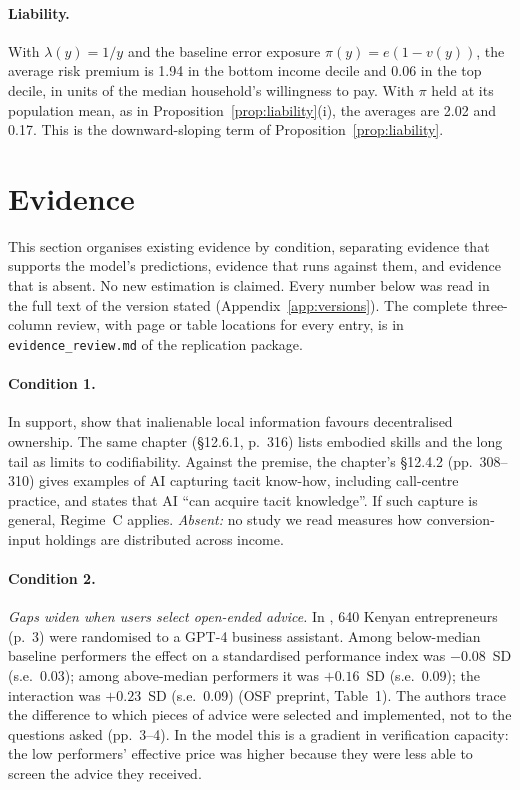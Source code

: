 \documentclass[12pt]{article}
\theoremstyle{remark}
\begin{document}
\paragraph{Liability.} With $\lambda(y)=1/y$ and the baseline error exposure $\pi(y)=e(1-v(y))$, the average risk premium is 1.94 in the bottom income decile and 0.06 in the top decile, in units of the median household's willingness to pay. With $\pi$ held at its population mean, as in Proposition~\ref{prop:liability}(i), the averages are 2.02 and 0.17. This is the downward-sloping term of Proposition~\ref{prop:liability}.

\section{Evidence}\label{sec:evidence}

This section organises existing evidence by condition, separating evidence that supports the model's predictions, evidence that runs against them, and evidence that is absent. No new estimation is claimed. Every number below was read in the full text of the version stated (Appendix~\ref{app:versions}). The complete three-column review, with page or table locations for every entry, is in \texttt{evidence\_review.md} of the replication package.

\paragraph{Condition 1.} In support, \citet[Proposition~2, p.~308]{brynjolfsson2026hayek} show that inalienable local information favours decentralised ownership. The same chapter (\S12.6.1, p.~316) lists embodied skills and the long tail as limits to codifiability. Against the premise, the chapter's \S12.4.2 (pp.~308--310) gives examples of AI capturing tacit know-how, including call-centre practice, and \citet[p.~33]{garicano2026comment} states that AI ``can acquire tacit knowledge''. If such capture is general, Regime~C applies. \emph{Absent:} no study we read measures how conversion-input holdings are distributed across income.

\paragraph{Condition 2.} \emph{Gaps widen when users select open-ended advice.} In \citet{otis2026uneven}, 640 Kenyan entrepreneurs (p.~3) were randomised to a GPT-4 business assistant. Among below-median baseline performers the effect on a standardised performance index was $-0.08$~SD (s.e.\ 0.03); among above-median performers it was $+0.16$~SD (s.e.\ 0.09); the interaction was $+0.23$~SD (s.e.\ 0.09) (OSF preprint, Table~1). The authors trace the difference to which pieces of advice were selected and implemented, not to the questions asked (pp.~3--4). In the model this is a gradient in verification capacity: the low performers' effective price was higher because they were less able to screen the advice they received.
\end{document}
